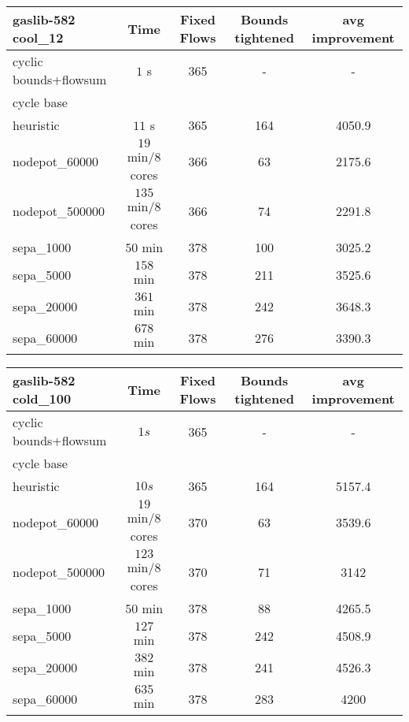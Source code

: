 \begin{center}
\begin{tabular}{ l | c | c | c | c }

\textbf{gaslib-582 cool\_12} & Time  & Fixed Flows & Bounds tightened & avg improvement\\
\hline
 cyclic bounds+flowsum& $1$ s & 365 & - & - \\
 cycle base& $ $ &  &  & \\
 heuristic& $11$ s & 365 & 164 & 4050.9 \\
 nodepot\_60000& $19$ min/8 cores & 366 & 63 &  2175.6 \\ 
 nodepot\_500000& $135$ min/8 cores & 366 & 74 & 2291.8  \\ 
 sepa\_1000& $ 50$ min  & 378 & 100 & 3025.2\\
 sepa\_5000& $ 158$ min & 378 & 211 & 3525.6\\ 
 sepa\_20000& $ 361$ min & 378 & 242 & 3648.3  \\
 sepa\_60000& $678$ min  & 378 & 276 & 3390.3 \\
\end{tabular} 
\end{center}

\begin{center}
\begin{tabular}{ l | c | c | c | c }

\textbf{gaslib-582 cold\_100} & Time  & Fixed Flows & Bounds tightened & avg improvement\\
\hline
 cyclic bounds+flowsum& $1s$ & 365 & - & -  \\
 cycle base& $ $ &  &  & \\
 heuristic& $ 10s $& 365& 164 & 5157.4\\
 nodepot\_60000& $19$ min/8 cores & 370 & 63 & 3539.6  \\ 
 nodepot\_500000& $123$ min/8 cores & 370 & 71 & 3142  \\ 
 sepa\_1000& $50$ min  & 378 & 88 & 4265.5 \\
 sepa\_5000& $ 127$ min & 378 & 242 & 4508.9  \\
 sepa\_20000& $ 382$ min &  378& 241 & 4526.3  \\
 sepa\_60000& $635$ min  & 378& 283& 4200\\
\end{tabular} 
\end{center}

